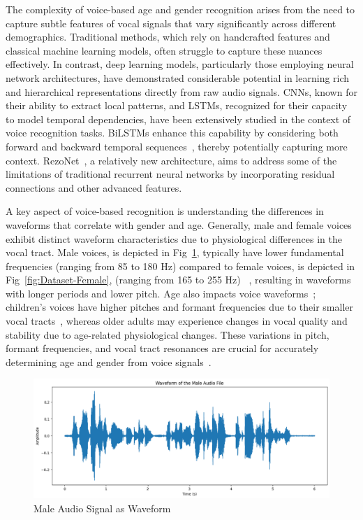 \documentclass[conference, 10pt]{IEEEtran}
\begin{document}
The complexity of voice-based age and gender recognition arises from the need to capture subtle features of vocal signals that vary significantly across different demographics. Traditional methods, which rely on handcrafted features and classical machine learning models, often struggle to capture these nuances effectively. In contrast, deep learning models, particularly those employing neural network architectures, have demonstrated considerable potential in learning rich and hierarchical representations directly from raw audio signals. CNNs, known for their ability to extract local patterns, and LSTMs, recognized for their capacity to model temporal dependencies, have been extensively studied in the context of voice recognition tasks. BiLSTMs enhance this capability by considering both forward and backward temporal sequences~\cite{rhanoui2019cnn}, thereby potentially capturing more context. RezoNet~\cite{hanifa2021review}, a relatively new architecture, aims to address some of the limitations of traditional recurrent neural networks by incorporating residual connections and other advanced features.

A key aspect of voice-based recognition is understanding the differences in waveforms that correlate with gender and age. Generally, male and female voices exhibit distinct waveform characteristics due to physiological differences in the vocal tract. Male voices, is depicted in Fig~\ref{fig:Dataset-Male}, typically have lower fundamental frequencies (ranging from 85 to 180 Hz) compared to female voices, is depicted in Fig~\ref{fig:Dataset-Female}, (ranging from 165 to 255 Hz) ~\cite{hanson1999glottal}, resulting in waveforms with longer periods and lower pitch. Age also impacts voice waveforms~\cite{dehqan2013effects}; children's voices have higher pitches and formant frequencies due to their smaller vocal tracts~\cite{lee1999acoustics}, whereas older adults may experience changes in vocal quality and stability due to age-related physiological changes. These variations in pitch, formant frequencies, and vocal tract resonances are crucial for accurately determining age and gender from voice signals~\cite{kent1992acoustic}.

\begin{figure}
    \centering
    \includegraphics[width=3 in]{Dataset-Male.png}
    \caption{Male Audio Signal as Waveform}
    \label{fig:Dataset-Male}
\end{figure}
\end{document}
